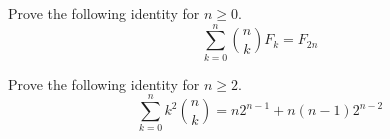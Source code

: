\documentclass[11pt,letterpaper,boxed]{hmcpset}
\begin{document}
\begin{solution}
    \vfill
\end{solution}

\newpage


\begin{problem}
    Prove the following identity for $n\geq0$.
    $$\sum_{k=0}^n\binom{n}{k}F_k=F_{2n}$$
\end{problem}

\begin{solution}
    \vfill
\end{solution}

\newpage


\begin{problem}
    Prove the following identity for $n\geq2$.
    $$\sum_{k=0}^nk^2\binom{n}{k}=n2^{n-1}+n(n-1)2^{n-2}$$
\end{problem}

\begin{solution}
    \vfill
\end{solution}

\newpage
\end{document}
